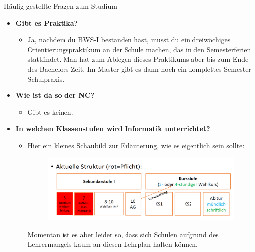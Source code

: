 \begin{block}{Häufig gestellte Fragen zum Studium}
\begin{large}
\begin{itemize}
\item \textbf{Gibt es Praktika?}
\begin{itemize}
	\item Ja, nachdem du BWS-I bestanden hast, musst du ein dreiwöchiges Orientierungspraktikum an der Schule machen, das in den Semesterferien stattfindet. Man hat zum Ablegen dieses Praktikums aber bis zum Ende des Bachelors Zeit. Im Master gibt es dann noch ein komplettes Semester Schulpraxis.
\end{itemize}

\item \textbf{Wie ist da so der NC?}
\begin{itemize}
	\item Gibt es keinen.
\end{itemize}
\item \textbf{In welchen Klassenstufen wird Informatik unterrichtet?}
\begin{itemize}
	\item Hier ein kleines Schaubild zur Erläuterung, wie es eigentlich sein sollte:
	\begin{figure}[h!]
	\includegraphics[width=0.6\linewidth]{charts/info_bed_klassenstufen.png}
	\end{figure}
	Momentan ist es aber leider so, dass sich Schulen aufgrund des Lehrermangels kaum an diesen Lehrplan halten können.
\end{itemize}
	\end{itemize}
\end{large}
\end{block}
